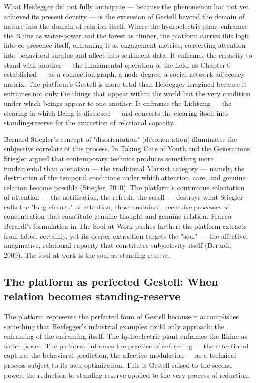 What Heidegger did not fully anticipate — because the phenomenon had not yet achieved its present density — is the extension of Gestell beyond the domain of nature into the domain of relation itself. Where the hydroelectric plant enframes the Rhine as water-power and the forest as timber, the platform carries this logic into co-presence itself, enframing it as engagement metrics, converting attention into behavioral surplus and affect into sentiment data. It enframes the capacity to stand with another — the fundamental operation of the field, as Chapter 0 established — as a connection graph, a node degree, a social network adjacency matrix. The platform's Gestell is more total than Heidegger imagined because it enframes not only the things that appear within the world but the very condition under which beings appear to one another. It enframes the Lichtung — the clearing in which Being is disclosed — and converts the clearing itself into standing-reserve for the extraction of relational capacity.

Bernard Stiegler's concept of "disorientation" (désorientation) illuminates the subjective correlate of this process. In Taking Care of Youth and the Generations, Stiegler argued that contemporary technics produces something more fundamental than alienation — the traditional Marxist category — namely, the destruction of the temporal conditions under which attention, care, and genuine relation become possible (Stiegler, 2010). The platform's continuous solicitation of attention — the notification, the refresh, the scroll — destroys what Stiegler calls the "long circuits" of attention, those sustained, recursive processes of concentration that constitute genuine thought and genuine relation. Franco Berardi's formulation in The Soul at Work pushes further: the platform extracts from labor, certainly, yet its deeper extraction targets the "soul" — the affective, imaginative, relational capacity that constitutes subjectivity itself (Berardi, 2009). The soul at work is the soul as standing-reserve.

\subsection{The platform as perfected Gestell: When relation becomes standing-reserve}

The platform represents the perfected form of Gestell because it accomplishes something that Heidegger's industrial examples could only approach: the enframing of the enframing itself. The hydroelectric plant enframes the Rhine as water-power. The platform enframes the practice of enframing — the attentional capture, the behavioral prediction, the affective modulation — as a technical process subject to its own optimization. This is Gestell raised to the second power: the reduction to standing-reserve applied to the very process of reduction.

